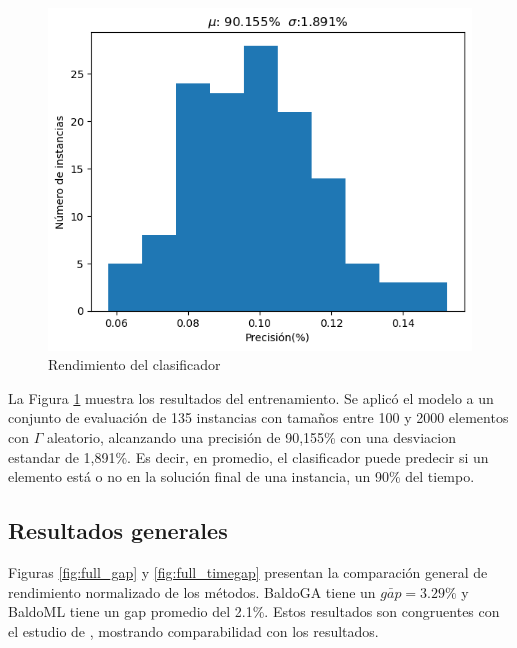 \documentclass[spanish, a4paper, 12pt, openany,final]{book}
\begin{document}
\begin{figure}[h]
	\centering
			\includegraphics[scale=0.75]{graphs/training_performance.png}
	\caption{Rendimiento del clasificador}
	\label{fig:model_performance}
\end{figure}

La Figura \ref{fig:model_performance} muestra los resultados del entrenamiento. Se aplicó el modelo a un conjunto de evaluación de 135 instancias con tamaños entre 100 y 2000 elementos con $\Gamma$ aleatorio, alcanzando una precisión de 90,155\% con una desviacion estandar de 1,891\%. Es decir, en promedio, el clasificador puede predecir si un elemento está o no en la solución final de una instancia, un 90\% del tiempo.


\subsection*{Resultados generales}

Figuras \ref{fig:full_gap} y \ref{fig:full_timegap} presentan la comparación general de rendimiento normalizado de los métodos.
 BaldoGA tiene un $\bar{gap} = 3.29\%$ y BaldoML tiene un gap promedio del 2.1\%. Estos resultados son congruentes con el estudio de \cite{baldo_polynomial_2023}, mostrando comparabilidad con los resultados.
\end{document}

